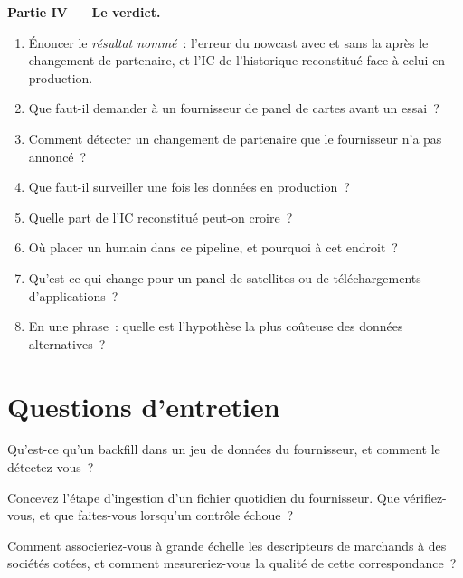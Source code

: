 \begin{problem}
\medskip\noindent\textbf{Partie IV --- Le verdict.}
\begin{enumerate}[resume]
\item Énoncer le \emph{résultat nommé}~: l'erreur du nowcast avec et sans la  après le changement de partenaire, et l'IC de
l'historique reconstitué face à celui en production.
\item Que faut-il demander à un fournisseur de panel de cartes avant un essai~?
\item Comment détecter un changement de partenaire que le fournisseur n'a pas annoncé~?
\item Que faut-il surveiller une fois les données en production~?
\item Quelle part de l'IC reconstitué peut-on croire~?
\item Où placer un humain dans ce pipeline, et pourquoi à cet endroit~?
\item Qu'est-ce qui change pour un panel de satellites ou de téléchargements d'applications~?
\item En une phrase~: quelle est l'hypothèse la plus coûteuse des données alternatives~?
\end{enumerate}
\end{problem}

\section{Questions d'entretien}

\begin{interviewq}\label{iq:ml:alternative-data-pipelines:1}
Qu'est-ce qu'un backfill dans un jeu de données du fournisseur, et comment le détectez-vous~?
\end{interviewq}

\begin{interviewq}\label{iq:ml:alternative-data-pipelines:2}
Concevez l'étape d'ingestion d'un fichier quotidien du fournisseur. Que vérifiez-vous, et que faites-vous lorsqu'un contrôle échoue~?
\end{interviewq}

\begin{interviewq}\label{iq:ml:alternative-data-pipelines:3}
Comment associeriez-vous à grande échelle les descripteurs de marchands à des sociétés cotées, et comment mesureriez-vous la qualité de cette correspondance~?
\end{interviewq}

